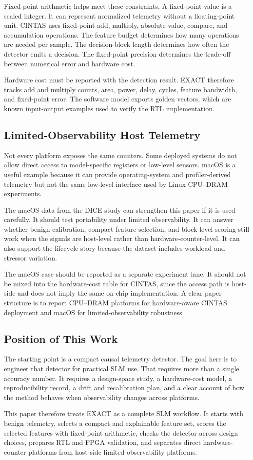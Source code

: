 Fixed-point arithmetic helps meet these constraints. A fixed-point value is a scaled integer. It can represent normalized telemetry without a floating-point unit. CINTAS uses fixed-point add, multiply, absolute-value, compare, and accumulation operations. The feature budget determines how many operations are needed per sample. The decision-block length determines how often the detector emits a decision. The fixed-point precision determines the trade-off between numerical error and hardware cost.

Hardware cost must be reported with the detection result. EXACT therefore tracks add and multiply counts, area, power, delay, cycles, feature bandwidth, and fixed-point error. The software model exports golden vectors, which are known input-output examples used to verify the RTL implementation.

\subsection{Limited-Observability Host Telemetry}

Not every platform exposes the same counters. Some deployed systems do not allow direct access to model-specific registers or low-level sensors. macOS is a useful example because it can provide operating-system and profiler-derived telemetry but not the same low-level interface used by Linux CPU--DRAM experiments.

The macOS data from the DICE study can strengthen this paper if it is used carefully. It should test portability under limited observability. It can answer whether benign calibration, compact feature selection, and block-level scoring still work when the signals are host-level rather than hardware-counter-level. It can also support the lifecycle story because the dataset includes workload and stressor variation.

The macOS case should be reported as a separate experiment lane. It should not be mixed into the hardware-cost table for CINTAS, since the access path is host-side and does not imply the same on-chip implementation. A clear paper structure is to report CPU--DRAM platforms for hardware-aware CINTAS deployment and macOS for limited-observability robustness.

\subsection{Position of This Work}

The starting point is a compact causal telemetry detector. The goal here is to engineer that detector for practical SLM use. That requires more than a single accuracy number. It requires a design-space study, a hardware-cost model, a reproducibility record, a drift and recalibration plan, and a clear account of how the method behaves when observability changes across platforms.

This paper therefore treats EXACT as a complete SLM workflow. It starts with benign telemetry, selects a compact and explainable feature set, scores the selected features with fixed-point arithmetic, checks the detector across design choices, prepares RTL and FPGA validation, and separates direct hardware-counter platforms from host-side limited-observability platforms.
